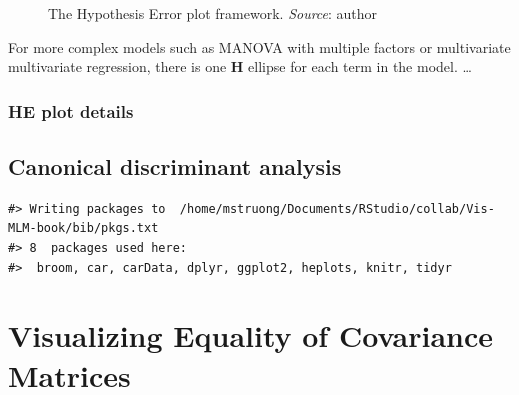 \documentclass[
  letterpaper,
  10pt,
  krantz2]{krantz}
\begin{document}
\begin{figure}


\caption{\label{fig-HE-framework}The Hypothesis Error plot framework.
\emph{Source}: author}

\end{figure}%

For more complex models such as MANOVA with multiple factors or
multivariate multivariate regression, there is one \(\mathbf{H}\)
ellipse for each term in the model. \ldots{}

\subsection{HE plot details}\label{he-plot-details}

\section{Canonical discriminant analysis}\label{sec-candisc}

\begin{verbatim}
#> Writing packages to  /home/mstruong/Documents/RStudio/collab/Vis-MLM-book/bib/pkgs.txt
#> 8  packages used here:
#>  broom, car, carData, dplyr, ggplot2, heplots, knitr, tidyr
\end{verbatim}

\chapter{Visualizing Equality of Covariance Matrices}\label{sec-eqcov}
\end{document}
